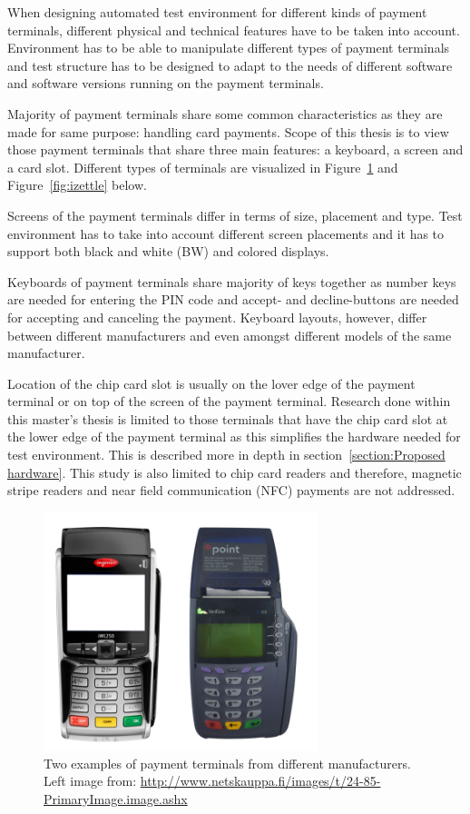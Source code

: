 When designing automated test environment for different kinds of payment terminals, different physical and technical features have to be taken into account. Environment has to be able to manipulate different types of payment terminals and test structure has to be designed to adapt to the needs of different software and software versions running on the payment terminals.

Majority of payment terminals share some common characteristics as they are made for same purpose: handling card payments. Scope of this thesis is to view those payment terminals that share three main features: a keyboard, a screen and a card slot. Different types of terminals are visualized in Figure~\ref{fig:terminals} and Figure~\ref{fig:izettle} below.

Screens of the payment terminals differ in terms of size, placement and type. Test environment has to take into account different screen placements and it has to support both black and white (BW) and colored displays.

Keyboards of payment terminals share majority of keys together as number keys are needed for entering the PIN code and accept- and decline-buttons are needed for accepting and canceling the payment. Keyboard layouts, however, differ between different manufacturers and even amongst different models of the same manufacturer.

Location of the chip card slot is usually on the lover edge of the payment terminal or on top of the screen of the payment terminal. Research done within this master's thesis is limited to those terminals that have the chip card slot at the lower edge of the payment terminal as this simplifies the hardware needed for test environment. This is described more in depth in section~\ref{section:Proposed hardware}. This study is also limited to chip card readers and therefore, magnetic stripe readers and near field communication (NFC) payments are not addressed.

\begin{figure}[ht]
  \begin{center}
    \includegraphics[width=8cm]{images/terminal1.png}
    \caption{Two examples of payment terminals from different manufacturers. Left image from: \url{http://www.netskauppa.fi/images/t/24-85-PrimaryImage.image.ashx}}
    \label{fig:terminals}
  \end{center}
\end{figure}

